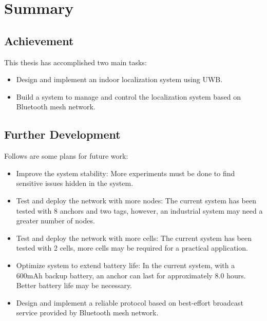 \documentclass[\main/main.tex]{subfiles}
\begin{document}
\graphicspath{{img/}{summary/img/}}

\chapter{Summary}

\section{Achievement}
This thesis has accomplished two main tasks:
\begin{itemize}
    \item Design and implement an indoor localization system using UWB.
    \item Build a system to manage and control the localization system based on Bluetooth mesh network.
\end{itemize}

\section{Further Development}
Follows are some plans for future work:
\begin{itemize}
    \item Improve the system stability: More experiments must be done to find sensitive issues hidden in the system.
    \item Test and deploy the network with more nodes: The current system has been tested with 8 anchors and two tags, however, an industrial system may need a greater number of nodes.
    \item Test and deploy the network with more cells: The current system has been tested with 2 cells, more cells may be required for a practical application.
    \item Optimize system to extend battery life: In the current system, with a 600mAh backup battery, an anchor can last for approximately 8.0 hours. Better battery life may be necessary.
    \item Design and implement a reliable protocol based on best-effort broadcast service provided by Bluetooth mesh network.
\end{itemize}
\end{document}
